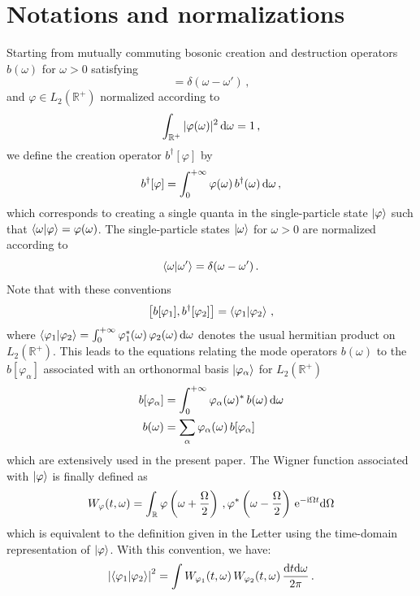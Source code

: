 
\section{Notations and normalizations}
\label{sec/notations}

Starting from mutually commuting bosonic creation and destruction operators $b(\omega)$ for
$\omega>0$ satisfying
\begin{equation}
	[b(\omega),b^\dagger(\omega')]=\delta(\omega-\omega') \,,
\end{equation}
and $\varphi\in L_2(\mathbb{R}^+)$ normalized according to
\begin{equation}
	\int_{\mathbb{R}^+}|\varphi(\omega)|^2\,\mathrm{d}\omega=1
\,,
\end{equation}
we define the creation operator $b^\dagger[\varphi]$ by
\begin{equation}
	b^\dagger[\varphi]=\int_0^{+\infty}\varphi(\omega)\,b^\dagger(\omega)\,\mathrm{d}\omega
	\,,
\end{equation}
which corresponds to creating a single quanta in the single-particle
state $\ket{\varphi}$ such that
$\braket{\omega}{\varphi}=\varphi(\omega)$. The single-particle states
$\ket{\omega}$ for $\omega>0$ are normalized according to
\begin{equation}
	\braket{\omega}{\omega'}=\delta(\omega-\omega')\,.
\end{equation}
Note that with these conventions
\begin{equation}
	\left[b[\varphi_1],b^\dagger[\varphi_2]\right]=\braket{\varphi_1}{\varphi_2}\,,
\end{equation}
where
$\braket{\varphi_1}{\varphi_2}=\int_0^{+\infty}\varphi_1^*(\omega)\,\varphi_2(\omega)\,\mathrm{d}\omega$
denotes the usual hermitian product on $L_2(\mathbb{R}^+)$.
This leads to the equations relating the mode operators $b(\omega)$ to
the $b[\varphi_\alpha]$ associated with an orthonormal basis
$\ket{\varphi_\alpha}$ for $L_2(\mathbb{R}^+)$
\begin{subequations}
	\begin{align}
		b[\varphi_\alpha]&=\int_0^{+\infty}\varphi_\alpha(\omega)^*\,b(\omega)\,\mathrm{d}\omega\\
		b(\omega)&=\sum_\alpha \varphi_\alpha(\omega)\,b[\varphi_\alpha]
	\end{align}
\end{subequations}
which are extensively used in the present paper. The Wigner function
associated with $\ket{\varphi}$ is finally defined as
\begin{equation}
	W_{\varphi}(t,\omega)=\int_{\mathbb{R}}\varphi\left(\omega+\frac{\Omega}{2}\right)
\,,
	\varphi^*\left(\omega-\frac{\Omega}{2}\right)\,\mathrm{e}^{-\mathrm{i}\Omega
	t}\mathrm{d}\Omega
\end{equation}
which is equivalent to the definition given in the Letter
using the time-domain representation of $\ket{\varphi}$. With this
convention, we have:
\begin{equation}
	\left|\braket{\varphi_1}{\varphi_2}\right|^2=\int
	W_{\varphi_1}(t,\omega)\,W_{\varphi_2}(t,\omega)\,\frac{\mathrm{d} t\mathrm{d}
	\omega}{2\pi}\,.
\end{equation}


